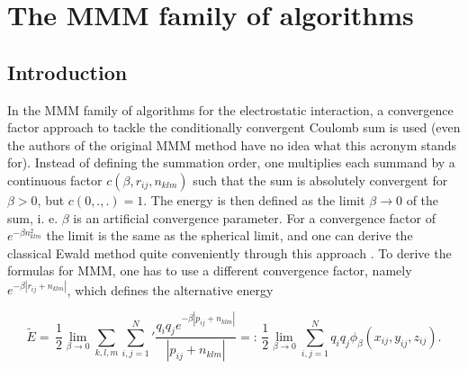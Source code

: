 %  
%   
%  
%  
%
\chapter{The MMM family of algorithms}
\label{chap:mmm}

\section{Introduction}

 In the MMM family of
algorithms for the electrostatic interaction, a convergence factor
approach to tackle the conditionally convergent Coulomb sum is used
(even the authors of the original MMM method have no idea what this
acronym stands for). Instead of defining the summation order, one
multiplies each summand by a continuous factor
$c(\beta,r_{ij},n_{klm})$ such that the sum is absolutely convergent
for $\beta>0$, but $c(0,.,.)=1$. The energy is then defined as the
limit $\beta\rightarrow 0$ of the sum, i. e. $\beta$ is an artificial
convergence parameter. For a convergence factor of $e^{-\beta
  n_{klm}^2}$ the limit is the same as the spherical limit, and one
can derive the classical Ewald method quite conveniently through this
approach \citep{smith81a}. To derive the formulas for MMM, one has to
use a different convergence factor, namely
$e^{-\beta|r_{ij}+n_{klm}|}$, which defines the alternative energy

\[ \tilde{E}=\,\frac{1}{2}\lim_{\beta\rightarrow
  0}\sum_{k,l,m}{\sum_{i,j=1}^N}' \frac{q_i q_je^{-\beta|p_{ij} +
    n_{klm}|}} {|p_{ij} + n_{klm}|}
=:\,\frac{1}{2}\lim_{\beta\rightarrow 0}\sum_{i,j=1}^N
q_iq_j\phi_\beta(x_{ij}, y_{ij},z_{ij}). \]

